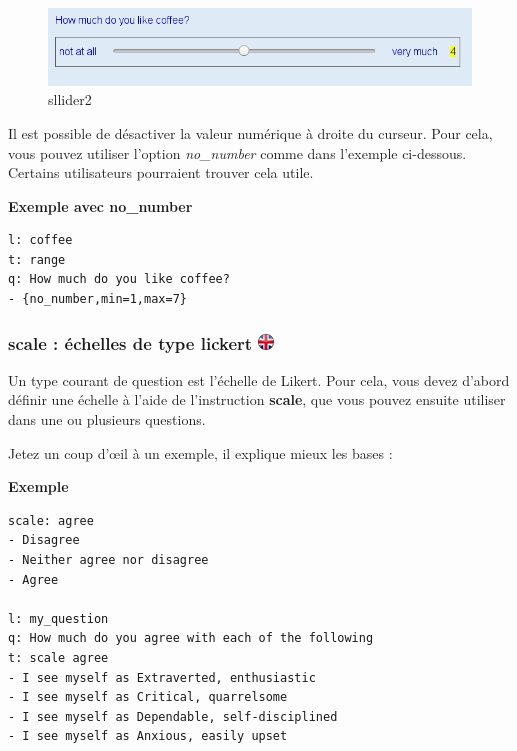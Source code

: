 \documentclass[
]{book}
\begin{document}
\begin{figure}
\centering
\includegraphics{img/slider2.png}
\caption{sllider2}
\end{figure}

Il est possible de désactiver la valeur numérique à droite du curseur. Pour cela, vous pouvez utiliser l'option \emph{no\_number} comme dans l'exemple ci-dessous. Certains utilisateurs pourraient trouver cela utile.

\textbf{Exemple avec no\_number}

\begin{verbatim}
l: coffee
t: range
q: How much do you like coffee?
- {no_number,min=1,max=7}
\end{verbatim}

\hypertarget{scale-uxe9chelles-de-type-lickert}{%
\subsubsection[scale : échelles de type lickert ]{\texorpdfstring{scale : échelles de type lickert \href{https://www.psytoolkit.org/doc3.2.0/online-survey-syntax.html\#scales}{\protect\includegraphics{img/ukflag.png}}}{scale : échelles de type lickert }}\label{scale-uxe9chelles-de-type-lickert}}

Un type courant de question est l'échelle de Likert. Pour cela, vous devez d'abord définir une échelle à l'aide de l'instruction \textbf{scale}, que vous pouvez ensuite utiliser dans une ou plusieurs questions.

Jetez un coup d'œil à un exemple, il explique mieux les bases :

\textbf{Exemple}

\begin{verbatim}
scale: agree
- Disagree
- Neither agree nor disagree
- Agree

l: my_question
q: How much do you agree with each of the following
t: scale agree
- I see myself as Extraverted, enthusiastic
- I see myself as Critical, quarrelsome
- I see myself as Dependable, self-disciplined
- I see myself as Anxious, easily upset
\end{verbatim}
\end{document}
